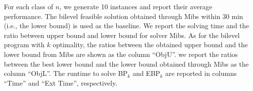 \documentclass[11pt]{article}
\begin{document}
For each class of $n$, we generate 10 instances and report their average performance. The bilevel feasible solution obtained through Mibs within 30 min (i.e., the lower bound) is used as the baseline. We report the solving time and the ratio between upper bound and lower bound for solver Mibs. As for the bilevel program with $k$ optimality, the ratios between the obtained upper bound and the lower bound from Mibs are shown as the column ``ObjU''. we report the ratios between the best lower bound and the lower bound obtained through Mibs as the column ``ObjL''. The runtime to solve BP$_k$ and EBP$_k$ are reported in columns ``Time'' and ``Ext Time'', respectively.


\begin{table}[htbp]
	\centering
	

\end{table}
\end{document}
